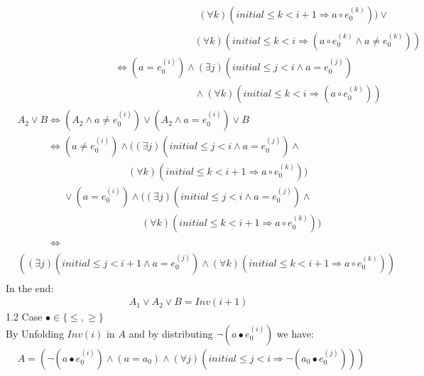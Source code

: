\documentclass[a4paper,10pt]{article}
\newcommand{\idx}{\ensuremath{i}\xspace}
\newcommand{\idxinitial}{\ensuremath{\mathit{initial}}\xspace}
\newcommand{\at}[1]{{(#1)}}
\newcommand{\impl}{\ensuremath{\Longrightarrow}}
\newcommand{\Inv}[1]{\ensuremath{\mathit{Inv}(#1)\xspace}}
\newenvironment{proof}[1][Proof.]{\begin{trivlist}
\item[\hskip \labelsep {\bfseries #1}]}{\end{trivlist}}
\begin{document}
\begin{proof}
\begin{align*}
   &\phantom{(A_2 \land a = e_0^\at{\idx}) \lor B = (a = e_0^\at{\idx}) \land (}
      (\forall k)(\idxinitial \leq k < \idx+1 \impl a \circ e_0^\at{k})) \lor \\
   &\phantom{(A_2 \land a = e_0^\at{\idx}) \lor B = (a = e_0^\at{\idx}) \land}
      (\forall k)(\idxinitial \leq k < \idx \impl (a \circ e_0^\at{k} \land a \neq e_0^\at{k}))\\
   &\phantom{(A_2 \land a = e_0^\at{\idx}) \lor B}
      \Leftrightarrow (a = e_0^\at{\idx}) \land (\exists j)(\idxinitial \leq j < \idx \land a = e_0^\at{j}) \\
   &\phantom{(A_2 \land a = e_0^\at{\idx}) \lor B = (a = e_0^\at{\idx}) \land}
      \land (\forall k)(\idxinitial \leq k < \idx \impl (a \circ e_0^\at{k}))
  \end{align*}
  \begin{align*}
   &A_2 \lor B \Leftrightarrow (A_2 \land a \neq e_0^\at{\idx}) \lor (A_2 \land a = e_0^\at{\idx}) \lor B\\
   &\phantom {A_2 \lor B}
      \Leftrightarrow (a \neq e_0^\at{\idx}) \land ((\exists j)(\idxinitial \leq j < \idx \land a = e_0^\at{j}) \land \\
   &\phantom {A_2 \lor B \Leftrightarrow (A_2 \land a \neq e_0^\at{\idx}}
     (\forall k)(\idxinitial \leq k < \idx+1 \impl a \circ e_0^\at{k})) \\ 
   &\phantom {A_2 \lor B \Leftrightarrow} 
      \lor (a = e_0^\at{\idx}) \land ((\exists j)(\idxinitial \leq j < \idx \land a = e_0^\at{j}) \land \\
   &\phantom {A_2 \lor B \Leftrightarrow (A_2 \land a \neq e_0^\at{\idx})}
      (\forall k)(\idxinitial \leq k < \idx+1 \impl a \circ e_0^\at{k})) \\ 
   &\phantom {A_2 \lor B}
   \Leftrightarrow\\
   &((\exists j)(\idxinitial \leq j < \idx+1 \land a = e_0^\at{j}) \land (\forall k)(\idxinitial \leq k < \idx+1 \impl a \circ e_0^\at{k})) \\ 
  \end{align*}
  In the end: 
  \begin{align*}
    &A_1 \lor A_2 \lor B = \Inv{\idx+1} 
  \end{align*}
  1.2 Case $\bullet \in \{\leq, \geq\}$ \\
  By Unfolding $\Inv{\idx}$ in $A$ and by distributing $\neg (a \bullet e_0^\at{\idx})$ we have:
  \begin{align*}
    &A= (\neg (a \bullet e_0^\at{\idx}) \land (a = a_0) \land (\forall j)(\idxinitial \leq j < \idx \impl \neg (a_0 \bullet e_0^\at{j}))) \\

\end{align*}
\end{proof}
\end{document}
